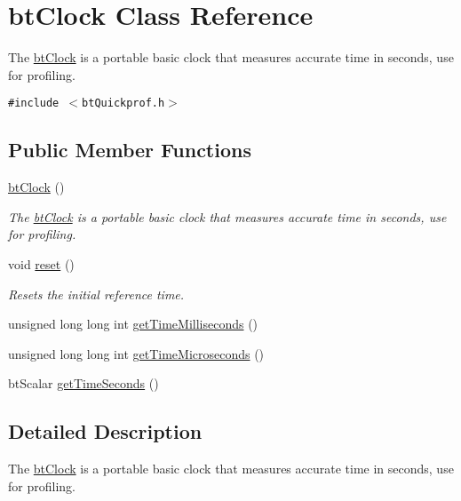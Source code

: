 \hypertarget{classbt_clock}{
\section{btClock Class Reference}
\label{classbt_clock}
}
The \hyperlink{classbt_clock}{btClock} is a portable basic clock that measures accurate time in seconds, use for profiling.  


{\tt \#include $<$btQuickprof.h$>$}

\subsection*{Public Member Functions}
\begin{CompactItemize}
\item 
\hypertarget{classbt_clock_c169d73599151d07b6449505d7c66738}{
\hyperlink{classbt_clock_c169d73599151d07b6449505d7c66738}{btClock} ()}
\label{classbt_clock_c169d73599151d07b6449505d7c66738}

\begin{CompactList}\small\item\em The \hyperlink{classbt_clock}{btClock} is a portable basic clock that measures accurate time in seconds, use for profiling. \item\end{CompactList}\item 
\hypertarget{classbt_clock_592eb764c2e7b645c9619ab7e483166c}{
void \hyperlink{classbt_clock_592eb764c2e7b645c9619ab7e483166c}{reset} ()}
\label{classbt_clock_592eb764c2e7b645c9619ab7e483166c}

\begin{CompactList}\small\item\em Resets the initial reference time. \item\end{CompactList}\item 
unsigned long long int \hyperlink{classbt_clock_989e96af94f4ec3ae28635f5f843c066}{getTimeMilliseconds} ()
\item 
unsigned long long int \hyperlink{classbt_clock_a58b76bfde0b0f3f33d0cb91ec6b6938}{getTimeMicroseconds} ()
\item 
btScalar \hyperlink{classbt_clock_3fd3c27b67fa12ff3a56a57679667936}{getTimeSeconds} ()
\end{CompactItemize}


\subsection{Detailed Description}
The \hyperlink{classbt_clock}{btClock} is a portable basic clock that measures accurate time in seconds, use for profiling. 

